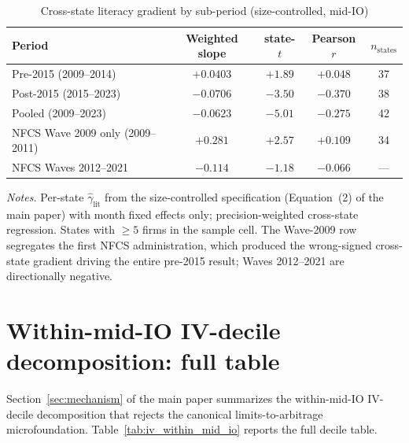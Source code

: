 \documentclass[12pt]{article}
\begin{document}
\begin{table}[h]
\centering
\caption{Cross-state literacy gradient by sub-period (size-controlled, mid-IO)}
\label{tab:prepost_grad}
\footnotesize
\begin{tabular}{lcccc}
\toprule
Period & Weighted slope & state-$t$ & Pearson $r$ & $n_{\text{states}}$ \\
\midrule
Pre-2015 (2009--2014) & $+0.0403$ & $+1.89$ & $+0.048$ & 37 \\
Post-2015 (2015--2023) & $\mathbf{-0.0706}$ & $\mathbf{-3.50}$ & $-0.370$ & 38 \\
Pooled (2009--2023) & $\mathbf{-0.0623}$ & $\mathbf{-5.01}$ & $-0.275$ & 42 \\
\midrule
NFCS Wave 2009 only (2009--2011) & $+0.281$ & $+2.57$ & $+0.109$ & 34 \\
NFCS Waves 2012--2021 & $-0.114$ & $-1.18$ & $-0.066$ & --- \\
\bottomrule
\end{tabular}

\medskip
{\footnotesize\textit{Notes.} Per-state $\hat\gamma_{\text{lit}}$ from the size-controlled specification (Equation~(2) of the main paper) with month fixed effects only; precision-weighted cross-state regression. States with $\geq 5$ firms in the sample cell. The Wave-2009 row segregates the first NFCS administration, which produced the wrong-signed cross-state gradient driving the entire pre-2015 result; Waves 2012--2021 are directionally negative.}
\end{table}

\section{Within-mid-IO IV-decile decomposition: full table}
\label{ia:ivwithinmidio}

Section~\ref{sec:mechanism} of the main paper summarizes the within-mid-IO IV-decile decomposition that rejects the canonical limits-to-arbitrage microfoundation. Table~\ref{tab:iv_within_mid_io} reports the full decile table.
\end{document}
